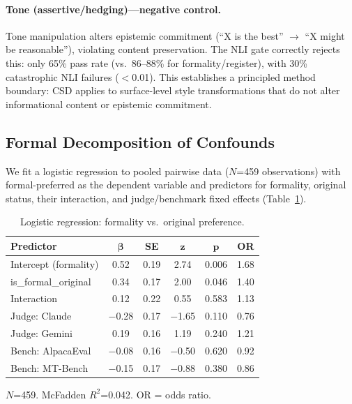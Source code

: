 \documentclass[11pt,a4paper]{article}
\newcommand{\sys}{CSD}
\begin{document}
\paragraph{Tone (assertive/hedging)---negative control.}
Tone manipulation alters epistemic commitment (``X is the best'' $\rightarrow$ ``X might be reasonable''), violating content preservation.
The NLI gate correctly rejects this: only 65\% pass rate (vs.\ 86--88\% for formality/register), with 30\% catastrophic NLI failures ($<$0.01).
This establishes a principled method boundary: \sys{} applies to surface-level style transformations that do not alter informational content or epistemic commitment.

\subsection{Formal Decomposition of Confounds}

We fit a logistic regression to pooled pairwise data ($N$=459 observations) with formal-preferred as the dependent variable and predictors for formality, original status, their interaction, and judge/benchmark fixed effects (Table~\ref{tab:logistic}).

\begin{table}[t]
\centering
\small
\caption{Logistic regression: formality vs.\ original preference.}
\label{tab:logistic}
\begin{tabular}{lccccc}
\toprule
\textbf{Predictor} & $\bm{\beta}$ & \textbf{SE} & $\bm{z}$ & $\bm{p}$ & \textbf{OR} \\
\midrule
Intercept (formality) & 0.52 & 0.19 & 2.74 & 0.006 & 1.68 \\
is\_formal\_original  & 0.34 & 0.17 & 2.00 & 0.046 & 1.40 \\
Interaction            & 0.12 & 0.22 & 0.55 & 0.583 & 1.13 \\
Judge: Claude          & $-$0.28 & 0.17 & $-$1.65 & 0.110 & 0.76 \\
Judge: Gemini          & 0.19 & 0.16 & 1.19 & 0.240 & 1.21 \\
Bench: AlpacaEval      & $-$0.08 & 0.16 & $-$0.50 & 0.620 & 0.92 \\
Bench: MT-Bench        & $-$0.15 & 0.17 & $-$0.88 & 0.380 & 0.86 \\
\bottomrule
\end{tabular}
\begin{flushleft}
\footnotesize $N$=459. McFadden $R^2$=0.042. OR = odds ratio.
\end{flushleft}
\end{table}
\end{document}

